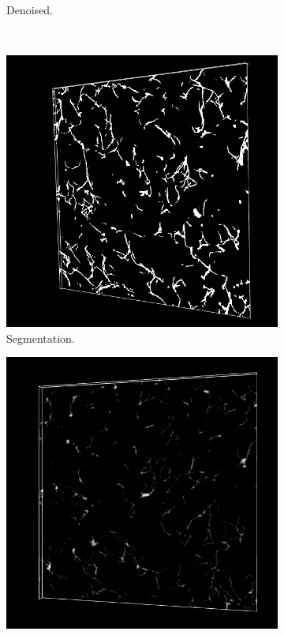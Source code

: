 \begin{figure}[H]
\begin{subfigure}{0.5\textwidth}
    \caption{Denoised.}
    \label{fig:pectin_denoised}
  \end{subfigure}\\[1ex]
  \begin{subfigure}{0.5\textwidth}
    \centering
    \includegraphics[width=0.9\linewidth]{Figures/chapter-image/pipeline_screenshots/pectin_segmented.png}
    \caption{Segmentation.}
    \label{fig:pectin_segmentation}
  \end{subfigure}%
  \begin{subfigure}{0.5\textwidth}
    \centering
    \includegraphics[width=0.9\linewidth]{Figures/chapter-image/pipeline_screenshots/pectin_dmap.png}

\end{subfigure}
\end{figure}
